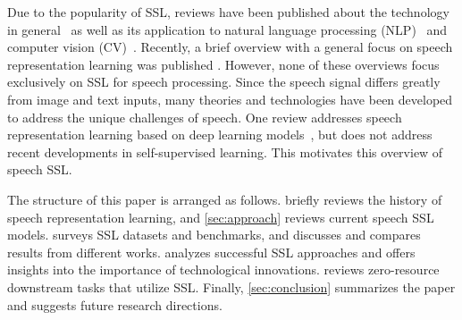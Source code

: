 Due to the popularity of SSL, reviews have been published about the
technology in general~\parencite{bommasani_opportunities_2021,ericsson_selfsupervised_2022,liu_selfsupervised_2021} as well as its application to natural language processing (NLP)~\parencite{rogers_primer_2020,liu_pretrain_2021,xia_which_2020,qiu_pretrained_2020} and computer vision (CV)~\parencite{jing_selfsupervised_2021}. Recently, a brief overview with a general focus on speech representation learning was published \parencite{borgholt_brief_2022}. 
However, none of these overviews focus exclusively on SSL for speech processing. Since the speech signal differs greatly from image and text inputs, many  theories  and technologies have been developed to address the unique challenges of speech. 
One review addresses speech representation learning based on deep learning models~\parencite{latif_deep_2021}, but does not address recent developments in self-supervised learning. This motivates this overview of speech SSL.


The structure of this paper is arranged as follows. 
briefly reviews the history of speech representation learning, and
\cref{sec:approach} reviews current speech SSL models.
 surveys SSL datasets and benchmarks, 
and discusses and compares results from different works. 
analyzes successful SSL approaches and offers insights into the
importance of technological innovations.  reviews 
zero-resource downstream tasks that utilize SSL. 
Finally, \cref{sec:conclusion} summarizes the paper and suggests 
future research directions.


